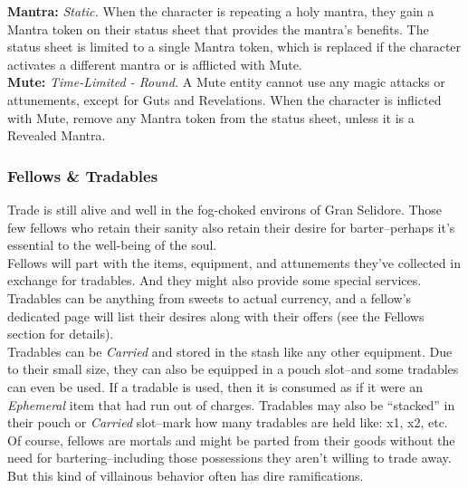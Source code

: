 \documentclass[12pt]{article}
\begin{document}
\begin{multicols*}{2}
\textbf{Mantra:} \emph{Static.} When the character is repeating a holy mantra, they gain a Mantra token on their status sheet that provides the mantra’s benefits. The status sheet is limited to a single Mantra token, which is replaced if the character activates a different mantra or is afflicted with Mute.\\

\textbf{Mute:} \emph{Time-Limited - Round.} A Mute entity cannot use any magic attacks or attunements, except for Guts and Revelations. When the character is inflicted with Mute, remove any Mantra token from the status sheet, unless it is a Revealed Mantra.

\subsubsection{Fellows \& Tradables}
Trade is still alive and well in the fog-choked environs of Gran Selidore. Those few fellows who retain their sanity also retain their desire for barter--perhaps it’s essential to the well-being of the soul.\\
Fellows will part with the items, equipment, and attunements they’ve collected in exchange for tradables. And they might also provide some special services. Tradables can be anything from sweets to actual currency, and a fellow’s dedicated page will list their desires along with their offers (see the Fellows section for details).\\
Tradables can be \emph{Carried} and stored in the stash like any other equipment. Due to their small size, they can also be equipped in a pouch slot--and some tradables can even be used. If a tradable is used, then it is consumed as if it were an \emph{Ephemeral} item that had run out of charges. Tradables may also be “stacked” in their pouch or \emph{Carried} slot--mark how many tradables are held like: x1, x2, etc.\\
Of course, fellows are mortals and might be parted from their goods without the need for bartering--including those possessions they aren’t willing to trade away. But this kind of villainous behavior often has dire ramifications.


\end{multicols*}
\end{document}
